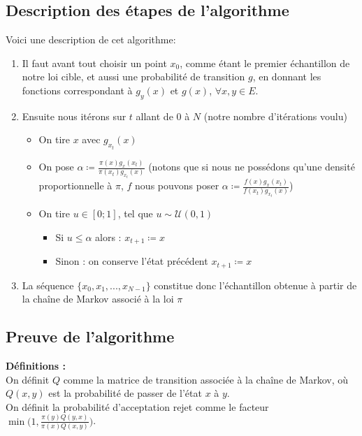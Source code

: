 \documentclass{article}
\begin{document}
\label{description-algo-hast-met}
\subsection{Description des étapes de l'algorithme}

Voici une description de cet algorithme:

\begin{enumerate}
    \item Il faut avant tout choisir un point $x_0$, comme étant le premier échantillon de notre loi cible, et aussi une probabilité de transition $g$, en donnant les fonctions correspondant à $g_y(x)$ et $g(x)$, $\forall x,y \in E$.
    \item Ensuite nous itérons sur $t$ allant de 0 à $N$ (notre nombre d'itérations voulu)
    \begin{itemize}
        \item On tire $x$ avec $g_{x_t}(x)$  
        \item On pose $\alpha \coloneqq \frac{ \pi(x) g_x(x_t)}{\pi(x_t) g_{x_t}(x)}$ (notons que si nous ne possédons qu'une densité proportionnelle à $\pi$, $f$ nous pouvons poser $\alpha \coloneqq \frac{ f(x) g_x(x_t)}{f(x_t) g_{x_t}(x)}$)  
        \item On tire $u \in [0;1]$, tel que $u  \sim \mathcal{U}(0,1)$ 
        \begin{itemize}
            \item Si $u \leqslant \alpha$ alors : $x_{t+1} \coloneqq x$  
            \item Sinon : on conserve l'état précédent $x_{t+1} \coloneqq x$  
        \end{itemize}
    \end{itemize}
    \item La séquence $\{x_0,x_1, ... ,x_{N-1}\}$ constitue donc l'échantillon obtenue à partir de la chaîne de Markov associé à la loi $\pi$
\end{enumerate}

\subsection{Preuve de l'algorithme}


\textbf{Définitions :} \\ 
On définit $Q$ comme la matrice de transition associée à la chaîne de Markov, où $Q(x, y)$ est la probabilité de passer de l'état $x$ à $y$.\\
On définit la probabilité d'acceptation rejet comme le facteur $\min\big(1, \frac{\pi(y) Q(y, x)}{\pi(x) Q(x, y)} \big)$.
\end{document}
